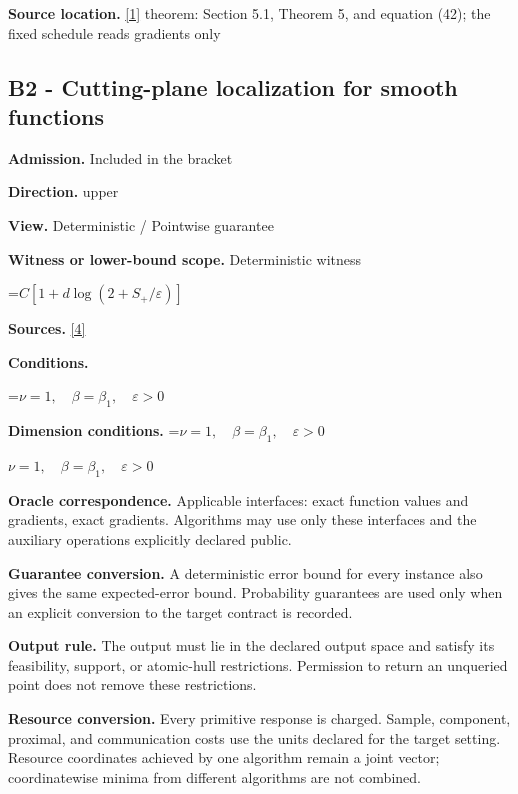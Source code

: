 \documentclass[10pt,a4paper]{article}
\newcommand{\AtlasMath}[1]{\par\begingroup\centering\setbox0=\hbox{$\displaystyle #1$}\ifdim\wd0>1.4\linewidth\typeout{ATLAS WIDE FORMULA: \the\wd0}\fi\ifdim\wd0>\linewidth\resizebox{\linewidth}{!}{\box0}\else\box0\fi\par\endgroup}
\newcommand{\AtlasInlineMath}[1]{\begingroup\setbox0=\hbox{$#1$}\ifdim\wd0>.4\linewidth\endgroup\AtlasMath{#1}\else\endgroup$#1$\fi}
\begin{document}
\textbf{Source location.} \href{https://optimization-online.org/wp-content/uploads/2010/12/2865.pdf}{[1]} theorem: Section 5.1, Theorem 5, and equation (42); the fixed schedule reads gradients only



\subsection{B2 - Cutting-plane localization for smooth functions}


\textbf{Admission.} Included in the bracket



\textbf{Direction.} upper



\textbf{View.} Deterministic / Pointwise guarantee



\textbf{Witness or lower-bound scope.} Deterministic witness



\AtlasMath{C[1+d\log(2+S_+/\varepsilon)]}


\textbf{Sources.} \href{https://arxiv.org/pdf/2609.32910}{[4]}



\textbf{Conditions.}
\AtlasMath{\nu=1,\quad\beta=\beta_1,\quad\varepsilon>0}




\textbf{Dimension conditions.} \AtlasInlineMath{\nu=1,\quad\beta=\beta_1,\quad\varepsilon>0}



\textbf{Oracle correspondence.} Applicable interfaces: exact function values and gradients, exact gradients. Algorithms may use only these interfaces and the auxiliary operations explicitly declared public.



\textbf{Guarantee conversion.} A deterministic error bound for every instance also gives the same expected-error bound. Probability guarantees are used only when an explicit conversion to the target contract is recorded.



\textbf{Output rule.} The output must lie in the declared output space and satisfy its feasibility, support, or atomic-hull restrictions. Permission to return an unqueried point does not remove these restrictions.



\textbf{Resource conversion.} Every primitive response is charged. Sample, component, proximal, and communication costs use the units declared for the target setting. Resource coordinates achieved by one algorithm remain a joint vector; coordinatewise minima from different algorithms are not combined.
\end{document}
